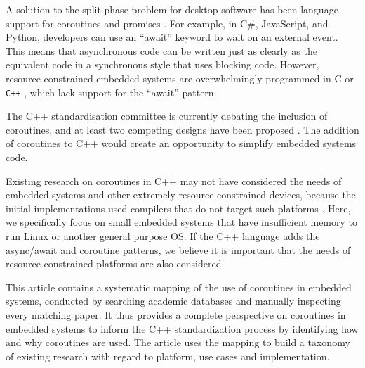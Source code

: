 \documentclass[format=acmsmall, review=false, screen=false]{acmart}
\providecommand{\DIFadd}[1]{{\protect\color{blue}\uwave{#1}}} %
\providecommand{\DIFaddbegin}{} %
\providecommand{\DIFaddend}{} %
\providecommand{\DIFdelbegin}{} %
\providecommand{\DIFdelend}{} %
\newcommand{\DIFscaledelfig}{0.5}
\newlength{\DIFdelgraphicswidth} %
\newlength{\DIFdelgraphicsheight} %
\newcommand{\DIFaddincludegraphics}[2][]{{\color{blue}\fbox{\DIFOincludegraphics[#1]{#2}}}} %
\newcommand{\DIFdelincludegraphics}[2][]{%
\sbox{\DIFdelgraphicsbox}{\DIFOincludegraphics[#1]{#2}}%
\settoboxwidth{\DIFdelgraphicswidth}{\DIFdelgraphicsbox} %
\settoboxtotalheight{\DIFdelgraphicsheight}{\DIFdelgraphicsbox} %
\scalebox{\DIFscaledelfig}{%
\parbox[b]{\DIFdelgraphicswidth}{\usebox{\DIFdelgraphicsbox}\\[-\baselineskip] \rule{\DIFdelgraphicswidth}{0em}}\llap{\resizebox{\DIFdelgraphicswidth}{\DIFdelgraphicsheight}{%
\setlength{\unitlength}{\DIFdelgraphicswidth}%
\begin{picture}(1,1)%
\thicklines\linethickness{2pt} %
{\color[rgb]{1,0,0}\put(0,0){\framebox(1,1){}}}%
{\color[rgb]{1,0,0}\put(0,0){\line( 1,1){1}}}%
{\color[rgb]{1,0,0}\put(0,1){\line(1,-1){1}}}%
\end{picture}%
}\hspace*{3pt}}} %
} %
\DeclareRobustCommand{\DIFaddbegin}{\DIFOaddbegin \let\includegraphics\DIFaddincludegraphics} %
\DeclareRobustCommand{\DIFaddend}{\DIFOaddend \let\includegraphics\DIFOincludegraphics} %
\DeclareRobustCommand{\DIFdelbegin}{\DIFOdelbegin \let\includegraphics\DIFdelincludegraphics} %
\DeclareRobustCommand{\DIFdelend}{\DIFOaddend \let\includegraphics\DIFOincludegraphics} %
\begin{document}
A solution to the split-phase problem for desktop software has been language support for coroutines \cite{Conway1963, Knuth1968, Marlin1979} and promises \cite{Brodu2015, Liskov1988, Madsen2017}. For example, in C\#, JavaScript, and Python, developers can use an “await” keyword to wait on an external event. This means that asynchronous code can be written just as clearly as the equivalent code in a synchronous style that uses blocking code. However, resource-constrained embedded systems are overwhelmingly programmed in C or \verb!C++! \cite{AspenCore2017, Skerrett2017}, which lack support for the “await” pattern.

The C++ standardisation committee is currently debating the inclusion of coroutines, and at least two competing designs have been proposed \cite{ISO2017, Romer2018}. The addition of coroutines to C++ would create an opportunity to simplify embedded systems code. \DIFdelbegin %

\DIFdelend Existing research on coroutines in C++ may not have considered the needs of embedded systems and other extremely resource-constrained devices, because the initial implementations used compilers that do not target such platforms \cite{Mittelette2015}. Here, we specifically focus on small embedded systems that have insufficient memory to run Linux or another general purpose OS. If the C++ language adds the async/await and coroutine patterns, we believe it is important that the needs of resource-constrained platforms are also considered.

This article contains a systematic mapping of the use of coroutines in embedded systems, conducted by searching academic databases and manually inspecting every matching paper. It thus provides a complete perspective on \DIFaddbegin \DIFadd{academic research addressing the use of }\DIFaddend coroutines in embedded systems to inform the C++ standardization process by identifying how and why coroutines are used. The article uses the mapping to build a taxonomy of existing research with regard to platform, use cases and implementation.
\end{document}
